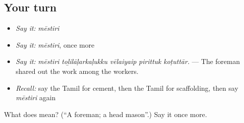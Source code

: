 \subsection*{Your turn}
\begin{itemize}
\raggedright
  \item \emph{Say it:} \emph{mēstiri}
  \item \emph{Say it:} \emph{mēstiri}, once more
  \item \emph{Say it:} \emph{mēstiri toḻilāḷarkaḷukku vēlaiyaip pirittuk koṭuttār.} — The foreman shared out the work among the workers.
  \item \emph{Recall:} say the Tamil for cement, then the Tamil for scaffolding, then say \emph{mēstiri} again
\end{itemize}

\begin{tcolorbox}[breakable,colback=teal!4,colframe=teal!35!black,title={Before you move on}]
What does  mean? (\textquotedblleft{}A foreman; a head mason\textquotedblright{}.) Say it once more.
\end{tcolorbox}
